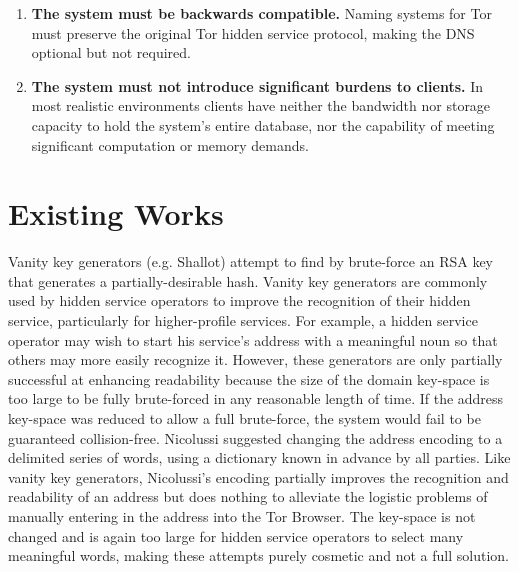 \documentclass{sig-alternate}
\begin{document}
\begin{enumerate}[noitemsep]
	\item \textbf{The system must be backwards compatible.} Naming systems for Tor must preserve the original Tor hidden service protocol, making the DNS optional but not required.
	\item \textbf{The system must not introduce significant burdens to clients.} In most realistic environments clients have neither the bandwidth nor storage capacity to hold the system's entire database, nor the capability of meeting significant computation or memory demands.
\end{enumerate}

\section{Existing Works} %
\label{sec:ExistingWorks}

Vanity key generators (e.g. Shallot\cite{KatmagicShallot}) attempt to find by brute-force an RSA key that generates a partially-desirable hash. Vanity key generators are commonly used by hidden service operators to improve the recognition of their hidden service, particularly for higher-profile services.\cite{syversongenuine} For example, a hidden service operator may wish to start his service's address with a meaningful noun so that others may more easily recognize it. However, these generators are only partially successful at enhancing readability because the size of the domain key-space is too large to be fully brute-forced in any reasonable length of time. If the address key-space was reduced to allow a full brute-force, the system would fail to be guaranteed collision-free. Nicolussi suggested changing the address encoding to a delimited series of words, using a dictionary known in advance by all parties.\cite{nicolussi2011human} Like vanity key generators, Nicolussi's encoding partially improves the recognition and readability of an address but does nothing to alleviate the logistic problems of manually entering in the address into the Tor Browser. The key-space is not changed and is again too large for hidden service operators to select many meaningful words, making these attempts purely cosmetic and not a full solution.
\end{document}
